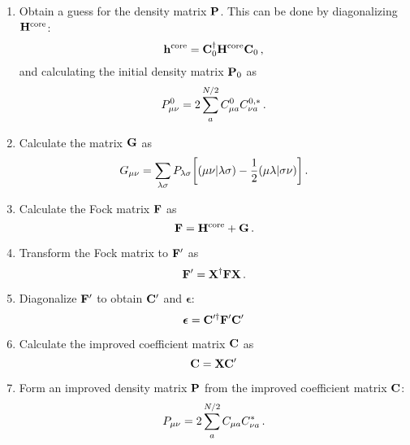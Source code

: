 \documentclass[12pt]{article}
\begin{document}
\begin{enumerate}
        \item Obtain a guess for the density matrix $\vb{P}$. This can be done by diagonalizing $\vb{H}^\text{core}$:
        \begin{equation}
            \vb{h}^\text{core} = \vb{C}^\dagger_0 \vb{H}^\text{core} \vb{C}_0 \thinspace ,
        \end{equation}
        and calculating the initial density matrix $\vb{P}_0$ as
        \begin{equation}
            P_{\mu \nu}^0 = 2 \sum_a^{N/2} C_{\mu a}^0 C_{\nu a}^{0, *} \thinspace .
        \end{equation}

        \item \label{item:scf:g_matrix}  Calculate the matrix $\vb{G}$ as
        \begin{equation}
            G_{\mu \nu} = \sum_{\lambda \sigma} P_{\lambda \sigma} \qty[ (\mu \nu|\lambda \sigma) - \frac{1}{2} (\mu \lambda|\sigma \nu)] \thinspace .
        \end{equation}

        \item Calculate the Fock matrix $\vb{F}$ as
        \begin{equation}
            \vb{F} = \vb{H}^\text{core} + \vb{G} \thinspace .
        \end{equation}

        \item Transform the Fock matrix to $\vb{F}'$ as
        \begin{equation}
            \vb{F}' = \vb{X}^\dagger \vb{F} \vb{X} \thinspace .
        \end{equation}

        \item Diagonalize $\vb{F}'$ to obtain $\vb{C}'$ and $\boldsymbol{\epsilon}$:
        \begin{equation}
            \boldsymbol{\epsilon} = \vb{C}'^\dagger \vb{F}' \vb{C}'
        \end{equation}

        \item Calculate the improved coefficient matrix $\vb{C}$ as
        \begin{equation}
            \vb{C} = \vb{X} \vb{C}'
        \end{equation}

        \item Form an improved density matrix $\vb{P}$ from the improved coefficient matrix $\vb{C}$:
        \begin{equation}
            P_{\mu \nu} = 2 \sum_a^{N/2} C_{\mu a} C^*_{\nu a} \thinspace .
        \end{equation}


\end{enumerate}
\end{document}
